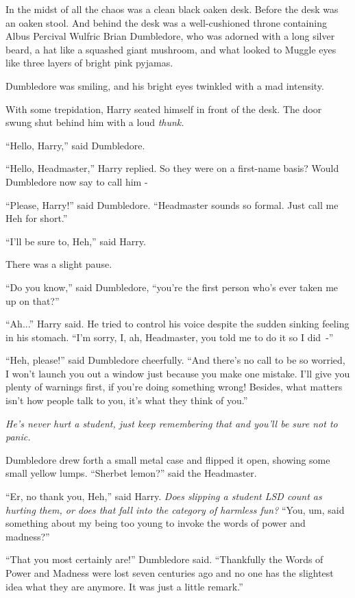 In the midst of all the chaos was a clean black oaken desk. Before the desk was an oaken stool. And behind the desk was a well-cushioned throne containing Albus Percival Wulfric Brian Dumbledore, who was adorned with a long silver beard, a hat like a squashed giant mushroom, and what looked to Muggle eyes like three layers of bright pink pyjamas.

Dumbledore was smiling, and his bright eyes twinkled with a mad intensity.

With some trepidation, Harry seated himself in front of the desk. The door swung shut behind him with a loud \emph{thunk.}

``Hello, Harry,'' said Dumbledore.

``Hello, Headmaster,'' Harry replied. So they were on a first-name basis? Would Dumbledore now say to call him -

``Please, Harry!'' said Dumbledore. ``Headmaster sounds so formal. Just call me Heh for short.''

``I'll be sure to, Heh,'' said Harry.

There was a slight pause.

``Do you know,'' said Dumbledore, ``you're the first person who's ever taken me up on that?''

``Ah...'' Harry said. He tried to control his voice despite the sudden sinking feeling in his stomach. ``I'm sorry, I, ah, Headmaster, you told me to do it so I did~-''

``Heh, please!'' said Dumbledore cheerfully. ``And there's no call to be so worried, I won't launch you out a window just because you make one mistake. I'll give you plenty of warnings first, if you're doing something wrong! Besides, what matters isn't how people talk to you, it's what they think of you.''

\emph{He's never hurt a student, just keep remembering that and you'll be sure not to panic.}

Dumbledore drew forth a small metal case and flipped it open, showing some small yellow lumps. ``Sherbet lemon?'' said the Headmaster.

``Er, no thank you, Heh,'' said Harry. \emph{Does slipping a student LSD count as hurting them, or does that fall into the category of harmless fun?} ``You, um, said something about my being too young to invoke the words of power and madness?''

``That you most certainly are!'' Dumbledore said. ``Thankfully the Words of Power and Madness were lost seven centuries ago and no one has the slightest idea what they are anymore. It was just a little remark.''

